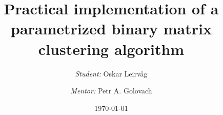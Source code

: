 
\title[Master thesis]{Practical implementation of a parametrized binary matrix clustering algorithm}

\author[Leirvåg, Oskar]
{
    \textit{Student:} Oskar Leirvåg
    \and
    \textit{Mentor:} Petr A. Golovach
}


\date[\today]{\today}
